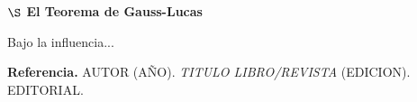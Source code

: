 


\begin{center}
    {\large \textbf{ $\S$ El Teorema de Gauss-Lucas}}
\end{center}

{\fontsize{7}{5}
Bajo la influencia... 
}

{\footnotesize 
\textbf{Referencia.}
AUTOR (AÑO). \textit{TITULO LIBRO/REVISTA} (EDICION). EDITORIAL.
} 

